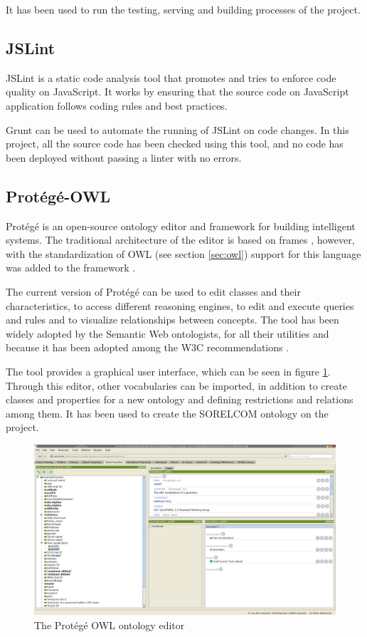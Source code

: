 It has been used to run the testing, serving and building processes of the project.

\subsection{JSLint}

JSLint \cite{jslint} is a static code analysis tool that promotes and tries to enforce code quality on JavaScript. It works by ensuring that the source code on JavaScript application follows coding rules and best practices.

Grunt can be used to automate the running of JSLint on code changes. In this project, all the source code has been checked using this tool, and no code has been deployed without passing a linter with no errors.

\subsection{Prot\'eg\'e-OWL}

Prot\'eg\'e is an open-source ontology editor and framework for building intelligent systems\cite{protege1}. The traditional architecture of the editor is based on frames \cite{protege2}, however, with the standardization of OWL (see section \ref{sec:owl}) support for this language was added to the framework \cite{protege3}.

The current version of Prot\'eg\'e can be used to edit classes and their characteristics, to access different reasoning engines, to edit and execute queries and rules and to visualize relationships between concepts. The tool has been widely adopted by the Semantic Web ontologists, for all their utilities and because it has been adopted among the W3C recommendations \cite{protege4}.

The tool provides a graphical user interface, which can be seen in figure \ref{fig:protege}. Through this editor, other vocabularies can be imported, in addition to create classes and properties for a new ontology and defining restrictions and relations among them. It has been used to create the SORELCOM ontology on the project.

\begin{figure}[ht]
  \centering
  \includegraphics[width=.8\textwidth]{fig/protege}
  \caption{The Prot\'eg\'e OWL ontology editor}
  \label{fig:protege}
\end{figure} 


